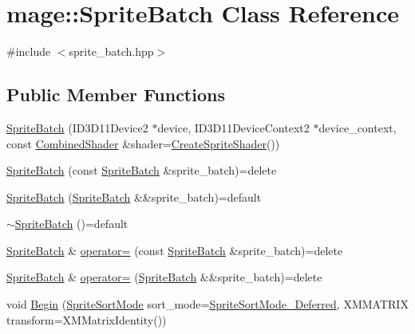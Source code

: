 \hypertarget{classmage_1_1_sprite_batch}{}\section{mage\+:\+:Sprite\+Batch Class Reference}
\label{classmage_1_1_sprite_batch}


{\ttfamily \#include $<$sprite\+\_\+batch.\+hpp$>$}

\subsection*{Public Member Functions}
\begin{DoxyCompactItemize}
\item 
\hyperlink{classmage_1_1_sprite_batch_a2269b99bd1027ee80900573a2ee51242}{Sprite\+Batch} (I\+D3\+D11\+Device2 $\ast$device, I\+D3\+D11\+Device\+Context2 $\ast$device\+\_\+context, const \hyperlink{structmage_1_1_combined_shader}{Combined\+Shader} \&shader=\hyperlink{namespacemage_af6f5c6ae46131caa77e5361d23d5d7c8}{Create\+Sprite\+Shader}())
\item 
\hyperlink{classmage_1_1_sprite_batch_a10fe1d6cf1d2de9e087b370e7d696be8}{Sprite\+Batch} (const \hyperlink{classmage_1_1_sprite_batch}{Sprite\+Batch} \&sprite\+\_\+batch)=delete
\item 
\hyperlink{classmage_1_1_sprite_batch_a135ff32d678465b7017eef3ab0430229}{Sprite\+Batch} (\hyperlink{classmage_1_1_sprite_batch}{Sprite\+Batch} \&\&sprite\+\_\+batch)=default
\item 
\hyperlink{classmage_1_1_sprite_batch_ae36a9c05e756fe45341746b19e2d08bc}{$\sim$\+Sprite\+Batch} ()=default
\item 
\hyperlink{classmage_1_1_sprite_batch}{Sprite\+Batch} \& \hyperlink{classmage_1_1_sprite_batch_aa2a5df588d7589a36b38b35dc8a08a48}{operator=} (const \hyperlink{classmage_1_1_sprite_batch}{Sprite\+Batch} \&sprite\+\_\+batch)=delete
\item 
\hyperlink{classmage_1_1_sprite_batch}{Sprite\+Batch} \& \hyperlink{classmage_1_1_sprite_batch_ad46c172200bf47c10fa13fb3a70a4104}{operator=} (\hyperlink{classmage_1_1_sprite_batch}{Sprite\+Batch} \&\&sprite\+\_\+batch)=delete
\item 
void \hyperlink{classmage_1_1_sprite_batch_ac87527519c5adc9df0420c372f208374}{Begin} (\hyperlink{namespacemage_a256fa5833eecc408923de7ffadb5e014}{Sprite\+Sort\+Mode} sort\+\_\+mode=\hyperlink{namespacemage_a256fa5833eecc408923de7ffadb5e014a80d3415039a297067a179e981ef0dada}{Sprite\+Sort\+Mode\+\_\+\+Deferred}, X\+M\+M\+A\+T\+R\+IX transform=X\+M\+Matrix\+Identity())

\end{DoxyCompactItemize}
